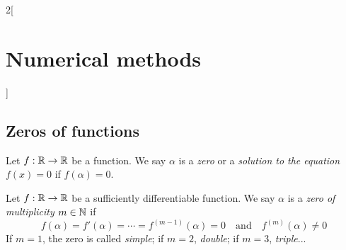 \documentclass[../../../main.tex]{subfiles}
\begin{document}
\begin{multicols}{2}[\section{Numerical methods}]
  \subsection{Zeros of functions}
  \begin{definition}
    Let $f:\mathbb{R}\rightarrow\mathbb{R}$ be a function. We say $\alpha$ is a \textit{zero} or a \textit{solution to the equation $f(x)=0$} if $f(\alpha)=0$.
  \end{definition}
  \begin{definition}
    Let $f:\mathbb{R}\rightarrow\mathbb{R}$ be a sufficiently differentiable function. We say $\alpha$ is a \textit{zero of multiplicity $m\in\mathbb{N}$} if $$f(\alpha)=f'(\alpha)=\cdots=f^{(m-1)}(\alpha)=0\quad\text{and}\quad f^{(m)}(\alpha)\ne0$$ If $m=1$, the zero is called \textit{simple}; if $m=2$, \textit{double}; if $m=3$, \textit{triple}...
  \end{definition}

\end{multicols}
\end{document}
